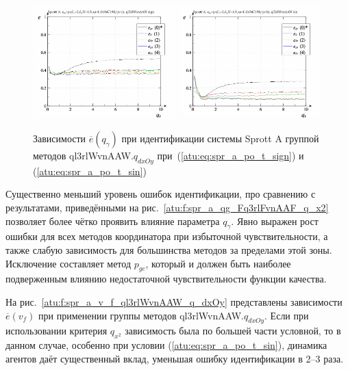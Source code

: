 \begin{figure}[htb!]
  \centerline{
    \includegraphics[width=0.49\textwidth]{p/cha/spr_a/ql3rlWvnAAW_dxOy/sprott_a_id2-p_q_gamma_sign.png}
    \hfill
    \includegraphics[width=0.49\textwidth]{p/cha/spr_a/ql3rlWvnAAW_dxOy/sprott_a_id2-p_q_gamma_sin.png}
  }
  \caption{Зависимости $\overline{e}(q_\gamma)$ при идентификации системы Sprott A группой методов ql3rlWvnAAW.$q_{dxOy}$
   при~(\ref{atu:eq:spr_a_po_t_sign}) и (\ref{atu:eq:spr_a_po_t_sin})}
  \label{atu:f:spr_a_ql3rlWvnAAW_q_dxOy}
\end{figure}

Существенно меньший уровень ошибок идентификации,
про сравнению с результатами, приведёнными на рис.~\ref{atu:f:spr_a_qg_Fq3rlFvnAAF_q_x2}
позволяет более чётко проявить влияние параметра $q_\gamma$.
Явно выражен рост ошибки для всех методов координатора при избыточной
чувствительности, а также слабую зависимость для большинства методов
за пределами этой зоны. Исключение составляет метод $p_{gc}$,
который и должен быть наиболее подверженным влиянию
недостаточной чувствительности функции качества.

На рис.~\ref{atu:f:spr_a_v_f_ql3rlWvnAAW_q_dxOy} представлены зависимости
$\overline{e}(v_f)$ при применении группы методов ql3rlWvnAAW.$q_{dxOy}$.
Если при использовании критерия $q_{x^2}$ зависимость была по большей части условной,
то в данном случае, особенно при условии  (\ref{atu:eq:spr_a_po_t_sin}),
динамика агентов даёт существенный вклад, уменьшая ошибку идентификации в 2--3 раза.

